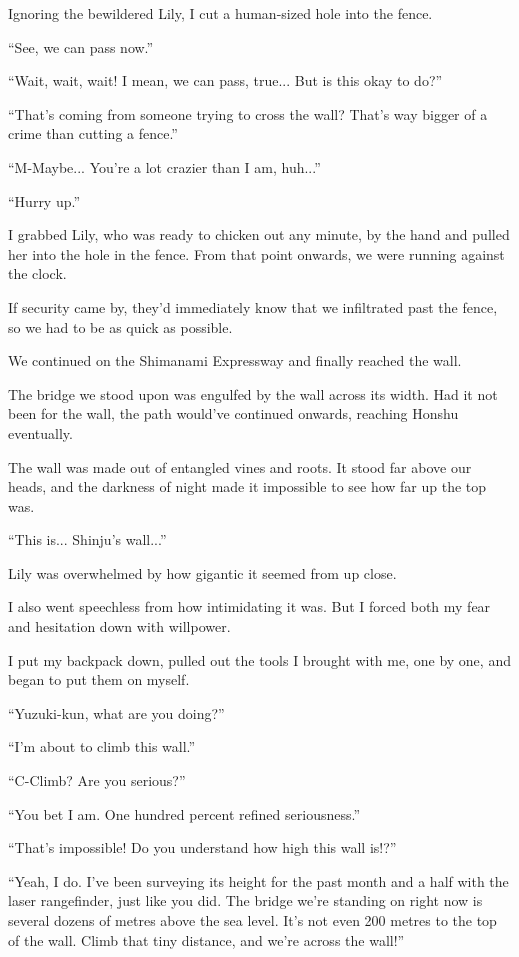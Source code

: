 Ignoring the bewildered Lily, I cut a human-sized hole into the fence.

``See, we can pass now.''

``Wait, wait, wait! I mean, we can pass, true... But is this okay to do?''

``That's coming from someone trying to cross the wall? That's way bigger of a crime than cutting a fence.''

``M-Maybe... You're a lot crazier than I am, huh...''

``Hurry up.''

I grabbed Lily, who was ready to chicken out any minute, by the hand and pulled her into the hole in the fence. From that point onwards, we were running against the clock.

If security came by, they'd immediately know that we infiltrated past the fence, so we had to be as quick as possible.

We continued on the Shimanami Expressway and finally reached the wall.

The bridge we stood upon was engulfed by the wall across its width. Had it not been for the wall, the path would've continued onwards, reaching Honshu eventually.

The wall was made out of entangled vines and roots. It stood far above our heads, and the darkness of night made it impossible to see how far up the top was.

``This is... Shinju's wall...''

Lily was overwhelmed by how gigantic it seemed from up close.

I also went speechless from how intimidating it was. But I forced both my fear and hesitation down with willpower.

I put my backpack down, pulled out the tools I brought with me, one by one, and began to put them on myself.

``Yuzuki-kun, what are you doing?''

``I'm about to climb this wall.''

``C-Climb? Are you serious?''

``You bet I am. One hundred percent refined seriousness.''

``That's impossible! Do you understand how high this wall is!?''

``Yeah, I do. I've been surveying its height for the past month and a half with the laser rangefinder, just like you did. The bridge we're standing on right now is several dozens of metres above the sea level. It's not even 200 metres to the top of the wall. Climb that tiny distance, and we're across the wall!''

